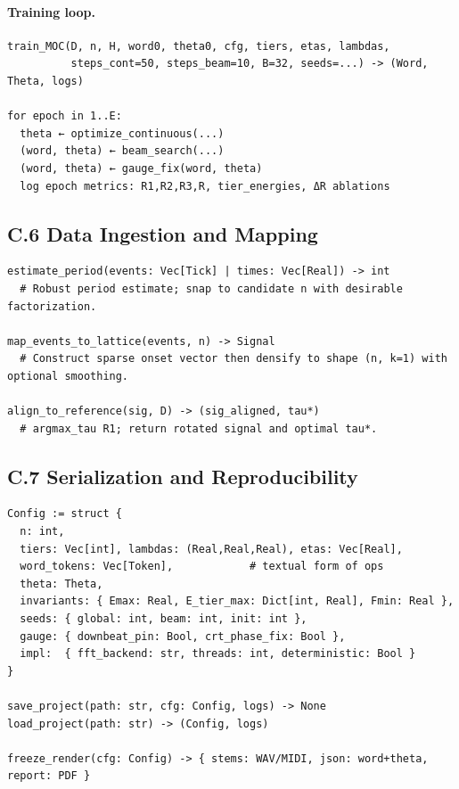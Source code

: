 \documentclass[12pt]{article}
\numberwithin{equation}{section}
\theoremstyle{plain}
\theoremstyle{definition}
\theoremstyle{remark}
\begin{document}
\paragraph{Training loop.}
\begin{verbatim}
train_MOC(D, n, H, word0, theta0, cfg, tiers, etas, lambdas,
          steps_cont=50, steps_beam=10, B=32, seeds=...) -> (Word, Theta, logs)

for epoch in 1..E:
  theta ← optimize_continuous(...)
  (word, theta) ← beam_search(...)
  (word, theta) ← gauge_fix(word, theta)
  log epoch metrics: R1,R2,R3,R, tier_energies, ΔR ablations
\end{verbatim}

\subsection*{C.6 Data Ingestion and Mapping}
\begin{verbatim}
estimate_period(events: Vec[Tick] | times: Vec[Real]) -> int
  # Robust period estimate; snap to candidate n with desirable factorization.

map_events_to_lattice(events, n) -> Signal
  # Construct sparse onset vector then densify to shape (n, k=1) with optional smoothing.

align_to_reference(sig, D) -> (sig_aligned, tau*)
  # argmax_tau R1; return rotated signal and optimal tau*.
\end{verbatim}

\subsection*{C.7 Serialization and Reproducibility}
\begin{verbatim}
Config := struct {
  n: int,
  tiers: Vec[int], lambdas: (Real,Real,Real), etas: Vec[Real],
  word_tokens: Vec[Token],            # textual form of ops
  theta: Theta,
  invariants: { Emax: Real, E_tier_max: Dict[int, Real], Fmin: Real },
  seeds: { global: int, beam: int, init: int },
  gauge: { downbeat_pin: Bool, crt_phase_fix: Bool },
  impl:  { fft_backend: str, threads: int, deterministic: Bool }
}

save_project(path: str, cfg: Config, logs) -> None
load_project(path: str) -> (Config, logs)

freeze_render(cfg: Config) -> { stems: WAV/MIDI, json: word+theta, report: PDF }
\end{verbatim}
\end{document}
